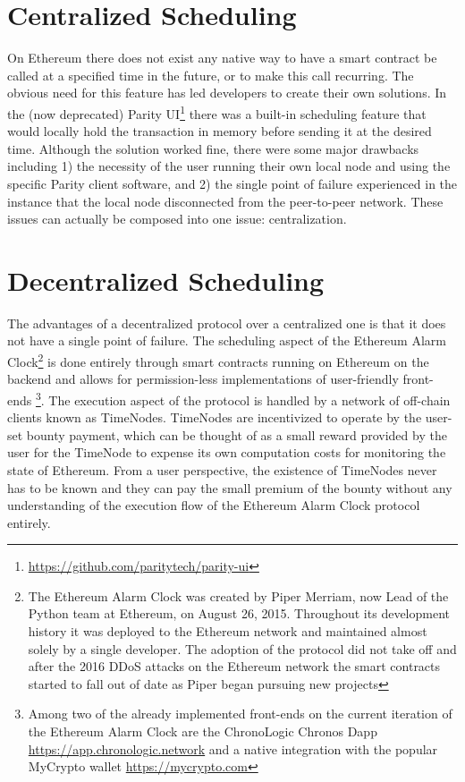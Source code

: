 \documentclass{report}
\begin{document}
  \section{Centralized Scheduling}
  On Ethereum there does not exist any native way to have a smart contract be called at a specified time in the future, or to make this call recurring. The obvious need for this feature has led developers to create their own solutions. In the (now deprecated) Parity UI\footnote{\url{https://github.com/paritytech/parity-ui}} there was a built-in scheduling feature that would locally hold the transaction in memory before sending it at the desired time. Although the solution worked fine, there were some major drawbacks including 1) the necessity of the user running their own local node and using the specific Parity client software, and 2) the single point of failure experienced in the instance that the local node disconnected from the peer-to-peer network. These issues can actually be composed into one issue: centralization.
  \section{Decentralized Scheduling}
  The advantages of a decentralized protocol over a centralized one is that it does not have a single point of failure. The scheduling aspect of the Ethereum Alarm Clock\footnote{The Ethereum Alarm Clock was created by Piper Merriam, now Lead of the Python team at Ethereum, on August 26, 2015. Throughout its development history it was deployed to the Ethereum network and maintained almost solely by a single developer. The adoption of the protocol did not take off and after the 2016 DDoS attacks on the Ethereum network the smart contracts started to fall out of date as Piper began pursuing new projects} is done entirely through smart contracts running on Ethereum on the backend and allows for permission-less implementations of user-friendly front-ends \footnote{Among two of the already implemented front-ends on the current iteration of the Ethereum Alarm Clock are the ChronoLogic Chronos Dapp \url{https://app.chronologic.network} and a native integration with the popular MyCrypto wallet \url{https://mycrypto.com}}. The execution aspect of the protocol is handled by a network of off-chain clients known as TimeNodes. TimeNodes are incentivized to operate by the user-set bounty payment, which can be thought of as a small reward provided by the user for the TimeNode to expense its own computation costs for monitoring the state of Ethereum. From a user perspective, the existence of TimeNodes never has to be known and they can pay the small premium of the bounty without any understanding of the execution flow of the Ethereum Alarm Clock protocol entirely.
\end{document}
